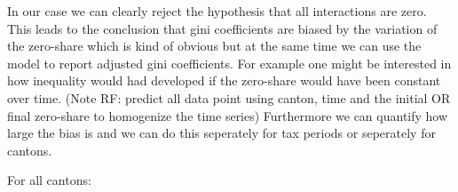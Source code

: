 \begin{knitrout}
\color{fgcolor}\begin{kframe}
\begin{alltt}
\end{alltt}


{\ttfamily\noindent\itshape\color{messagecolor}{\#\# \\\#\# Attaching package: 'survey'\\\#\# \\\#\# Das folgende Objekt ist maskiert from 'package:graphics':\\\#\# \\\#\#\ \ \ \  dotchart}}\begin{alltt}
 \hlstd{)}
\end{alltt}


{\ttfamily\noindent\bfseries\color{errorcolor}{\#\# Error: Objekt 'fit' nicht gefunden}}\end{kframe}
\end{knitrout}


In our case we can clearly reject the hypothesis that all interactions are zero. This leads to the conclusion  that gini coefficients are biased by the variation of the zero-share which is kind of obvious but at the same time we can use the model to report adjusted gini coefficients. For example one might be interested in how inequality would had developed if the zero-share would have been constant over time. (Note RF: predict all data point using canton, time and the initial OR final zero-share to homogenize the time series)
Furthermore we can quantify how large the bias is and we can do this seperately for tax periods or seperately for cantons. 

For all cantons:

\begin{knitrout}
\color{fgcolor}\begin{kframe}
\begin{alltt}
 \hlkwb{<-}  \hlopt{~}  \hlopt{+}   
\end{alltt}


{\ttfamily\noindent\bfseries\color{errorcolor}{\#\# Error: 'data' argument is of the wrong type}}\begin{alltt}
\end{alltt}


{\ttfamily\noindent\bfseries\color{errorcolor}{\#\# Error: Objekt 'reduced\_fit' nicht gefunden}}\end{kframe}
\end{knitrout}


